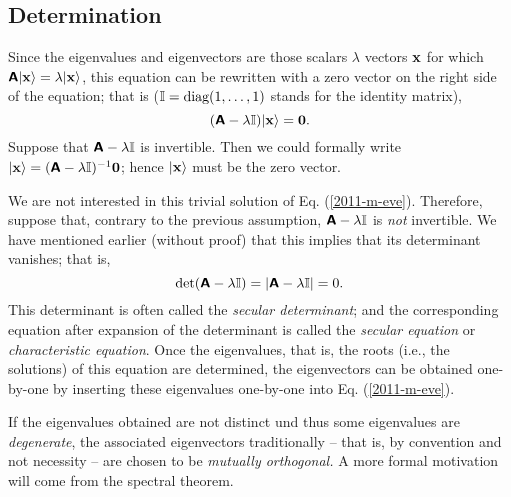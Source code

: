\subsection{Determination}



Since the eigenvalues and eigenvectors are those scalars $\lambda$  vectors ${\bf x}$ for which
$\textsf{\textbf{A}}\vert {\bf x}  \rangle=   \lambda \vert {\bf x}  \rangle$,
this equation can be rewritten with a zero vector on the right side of the equation; that is (${\Bbb I}=\textrm{diag}(1,\ldots ,1)$ stands for the identity matrix),
\begin{equation}
(\textsf{\textbf{A}} - \lambda {\Bbb I})\vert {\bf x}  \rangle= {\bf 0}.
\label{2011-m-eve}
\end{equation}
Suppose that $\textsf{\textbf{A}} - \lambda {\Bbb I}$ is invertible. Then we could formally write
$\vert {\bf x}  \rangle = (\textsf{\textbf{A}} - \lambda {\Bbb I})^{-1}{\bf 0}$; hence $\vert {\bf x}  \rangle$ must be the zero vector.

We are not interested in this trivial solution of Eq. (\ref{2011-m-eve}).
Therefore, suppose that, contrary to the previous assumption,
$\textsf{\textbf{A}} - \lambda {\Bbb I}$ is {\em not} invertible.
We have mentioned earlier (without proof) that this implies that its determinant vanishes; that is,
\begin{equation}
\textrm{det} (\textsf{\textbf{A}} - \lambda {\Bbb I}) = \vert \textsf{\textbf{A}} - \lambda {\Bbb I}\vert =0.
\label{2014-m-eve-ce}
\end{equation}
This determinant is often called the {\em secular determinant};
and the corresponding equation after expansion of the determinant is called the
{\em secular equation}
or {\em characteristic equation}.
Once the eigenvalues, that is, the roots (i.e., the solutions) of this equation are determined,
the eigenvectors can be obtained one-by-one by inserting these eigenvalues one-by-one into Eq. (\ref{2011-m-eve}).



If the eigenvalues obtained are not distinct und thus some eigenvalues are {\em degenerate},
the associated eigenvectors traditionally -- that is, by convention and not necessity -- are chosen to be
{\em mutually orthogonal.}
A more formal motivation will come from the spectral theorem.

